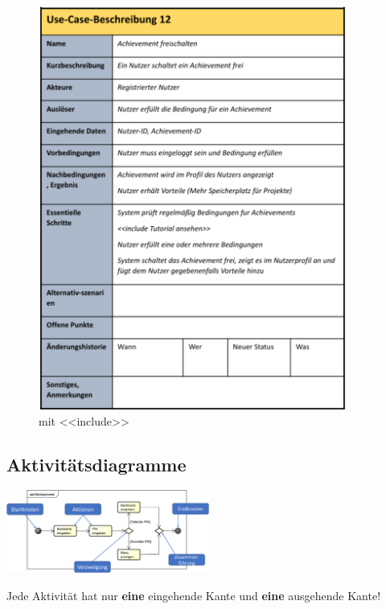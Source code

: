 \documentclass[11pt, a4paper]{article}
\begin{document}
\begin{figure}[ht]
\begin{minipage}[t]{0.45\textwidth}
        \centering \includegraphics[width=0.9\textwidth]{UseCase-14.png} \\
        \vspace{1em}
        \centering mit <<include>>
    \end{minipage}
\end{figure}



\subsection{Aktivitätsdiagramme}

\vspace{2em}

\centering
\includegraphics[width=0.5\textwidth]{Aktivitaet-00.png}


\raggedright Jede Aktivität hat nur \textbf{eine} eingehende Kante und \textbf{eine} ausgehende Kante!
\end{document}
